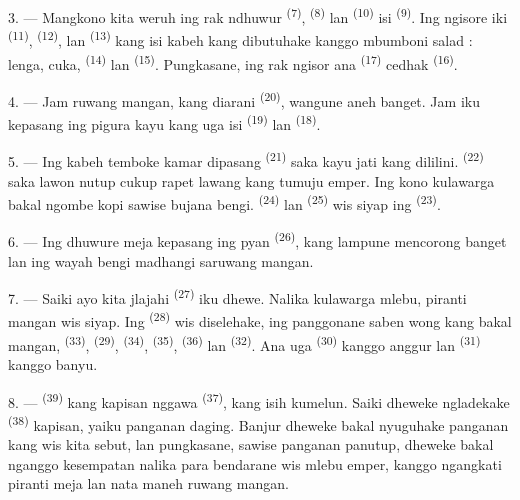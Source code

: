 3. --- Mangkono kita weruh ing rak ndhuwur 
\textsuperscript{(7)},  \textsuperscript{(8)} lan
 \textsuperscript{(10)} isi 
\textsuperscript{(9)}. Ing ngisore iki 
\textsuperscript{(11)},  \textsuperscript{(12)}, lan
 \textsuperscript{(13)} kang isi kabeh kang
dibutuhake kanggo mbumboni salad : lenga, cuka, 
\textsuperscript{(14)} lan  \textsuperscript{(15)}.
Pungkasane, ing rak ngisor ana  \textsuperscript{(17)}
cedhak  \textsuperscript{(16)}.

4. --- Jam ruwang mangan, kang diarani 
\textsuperscript{(20)}, wangune aneh banget. Jam iku kepasang ing
pigura kayu kang uga isi  \textsuperscript{(19)} lan
 \textsuperscript{(18)}.

\VUsaut{4.6mm}
\VUsaut{3.0mm}

5. --- Ing kabeh temboke kamar dipasang 
\textsuperscript{(21)} saka kayu jati kang dililini.  \textsuperscript{(22)} saka lawon nutup cukup rapet lawang kang
tumuju emper. Ing kono kulawarga bakal ngombe kopi sawise bujana
bengi.  \textsuperscript{(24)} lan 
\textsuperscript{(25)} wis siyap ing 
\textsuperscript{(23)}.

6. --- Ing dhuwure meja kepasang ing pyan 
\textsuperscript{(26)}, kang lampune mencorong banget lan ing wayah
bengi madhangi saruwang mangan.

7. --- Saiki ayo kita jlajahi 
\textsuperscript{(27)} iku dhewe. Nalika kulawarga mlebu, piranti
mangan wis siyap. Ing  \textsuperscript{(28)} wis
diselehake, ing panggonane saben wong kang bakal mangan,
 \textsuperscript{(33)}, 
\textsuperscript{(29)},  \textsuperscript{(34)},
 \textsuperscript{(35)}, 
\textsuperscript{(36)} lan  \textsuperscript{(32)}. Ana uga
 \textsuperscript{(30)} kanggo anggur lan 
\textsuperscript{(31)} kanggo banyu.

8. ---  \textsuperscript{(39)} kang kapisan nggawa
 \textsuperscript{(37)}, kang isih kumelun. Saiki
dheweke ngladekake  \textsuperscript{(38)} kapisan,
yaiku panganan daging. Banjur dheweke bakal nyuguhake panganan kang wis
kita sebut, lan pungkasane, sawise panganan panutup, dheweke bakal
nganggo kesempatan nalika para bendarane wis mlebu emper, kanggo
ngangkati piranti meja lan nata maneh ruwang mangan.

